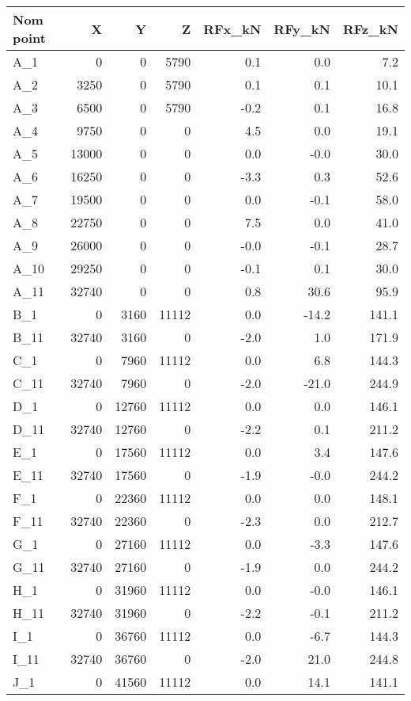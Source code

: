 \begin{tabular}{lrrrrrr}
\toprule
Nom point & X & Y & Z & RFx\_kN & RFy\_kN & RFz\_kN \\
\midrule
A\_1 & 0 & 0 & 5790 & 0.1 & 0.0 & 7.2 \\
A\_2 & 3250 & 0 & 5790 & 0.1 & 0.1 & 10.1 \\
A\_3 & 6500 & 0 & 5790 & -0.2 & 0.1 & 16.8 \\
A\_4 & 9750 & 0 & 0 & 4.5 & 0.0 & 19.1 \\
A\_5 & 13000 & 0 & 0 & 0.0 & -0.0 & 30.0 \\
A\_6 & 16250 & 0 & 0 & -3.3 & 0.3 & 52.6 \\
A\_7 & 19500 & 0 & 0 & 0.0 & -0.1 & 58.0 \\
A\_8 & 22750 & 0 & 0 & 7.5 & 0.0 & 41.0 \\
A\_9 & 26000 & 0 & 0 & -0.0 & -0.1 & 28.7 \\
A\_10 & 29250 & 0 & 0 & -0.1 & 0.1 & 30.0 \\
A\_11 & 32740 & 0 & 0 & 0.8 & 30.6 & 95.9 \\
B\_1 & 0 & 3160 & 11112 & 0.0 & -14.2 & 141.1 \\
B\_11 & 32740 & 3160 & 0 & -2.0 & 1.0 & 171.9 \\
C\_1 & 0 & 7960 & 11112 & 0.0 & 6.8 & 144.3 \\
C\_11 & 32740 & 7960 & 0 & -2.0 & -21.0 & 244.9 \\
D\_1 & 0 & 12760 & 11112 & 0.0 & 0.0 & 146.1 \\
D\_11 & 32740 & 12760 & 0 & -2.2 & 0.1 & 211.2 \\
E\_1 & 0 & 17560 & 11112 & 0.0 & 3.4 & 147.6 \\
E\_11 & 32740 & 17560 & 0 & -1.9 & -0.0 & 244.2 \\
F\_1 & 0 & 22360 & 11112 & 0.0 & 0.0 & 148.1 \\
F\_11 & 32740 & 22360 & 0 & -2.3 & 0.0 & 212.7 \\
G\_1 & 0 & 27160 & 11112 & 0.0 & -3.3 & 147.6 \\
G\_11 & 32740 & 27160 & 0 & -1.9 & 0.0 & 244.2 \\
H\_1 & 0 & 31960 & 11112 & 0.0 & -0.0 & 146.1 \\
H\_11 & 32740 & 31960 & 0 & -2.2 & -0.1 & 211.2 \\
I\_1 & 0 & 36760 & 11112 & 0.0 & -6.7 & 144.3 \\
I\_11 & 32740 & 36760 & 0 & -2.0 & 21.0 & 244.8 \\
J\_1 & 0 & 41560 & 11112 & 0.0 & 14.1 & 141.1 \\

\end{tabular}
